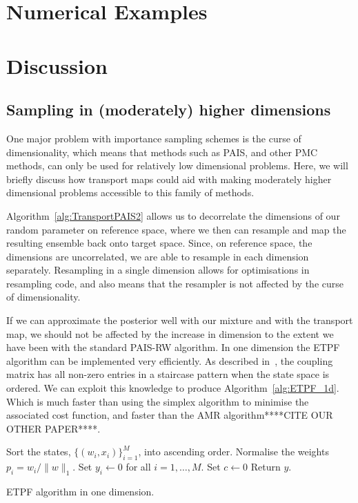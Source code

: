 \documentclass[final]{siamltex}
\begin{document}
\section{Numerical Examples}\label{sec:num}

\section{Discussion}\label{sec:conc}

\subsection{Sampling in (moderately) higher
  dimensions}\label{sec:TPAIS_higher_dim}
One major problem with importance sampling schemes is the curse of
dimensionality, which means that methods such as PAIS, and other PMC
methods, can only be used for relatively low dimensional
problems. Here, we will briefly discuss how transport maps could aid
with making moderately higher dimensional problems accessible to this
family of methods.

Algorithm~\ref{alg:TransportPAIS2} allows us to decorrelate the dimensions of our random parameter on reference space, where we then can resample and map the resulting ensemble back onto target space. Since, on reference space, the dimensions are uncorrelated, we are able to resample in each dimension separately. Resampling in a single dimension allows for optimisations in resampling code, and also means that the resampler is not affected by the curse of dimensionality.

If we can approximate the posterior well with our mixture and with the
transport map, we should not be affected by the increase in dimension
to the extent we have been with the standard PAIS-RW algorithm. In one
dimension the ETPF algorithm can be implemented very efficiently. As
described in~\cite{reich2013nonparametric}, the coupling matrix has
all non-zero entries in a staircase pattern when the state space is
ordered. We can exploit this knowledge to produce
Algorithm~\ref{alg:ETPF_1d}. Which is much faster than using the
simplex algorithm to minimise the associated cost function, and faster
than the AMR algorithm****CITE OUR OTHER PAPER****.

\begin{table}[!htpb]
\begin{algorithm}[H]
\DontPrintSemicolon
\BlankLine
Sort the states, $\{(w_i, x_i)\}_{i=1}^M$, into ascending order.\;
Normalise the weights $p_i = w_i/\|w\|_1$.\;
Set $y_i \leftarrow 0$ for all $i=1,\dots,M$.\;
Set $c \leftarrow 0$\;
Return $y$.\;
\caption{ETPF algorithm in one dimension.\label{alg:ETPF_1d}}
\end{algorithm}
\end{table}




\end{document}
